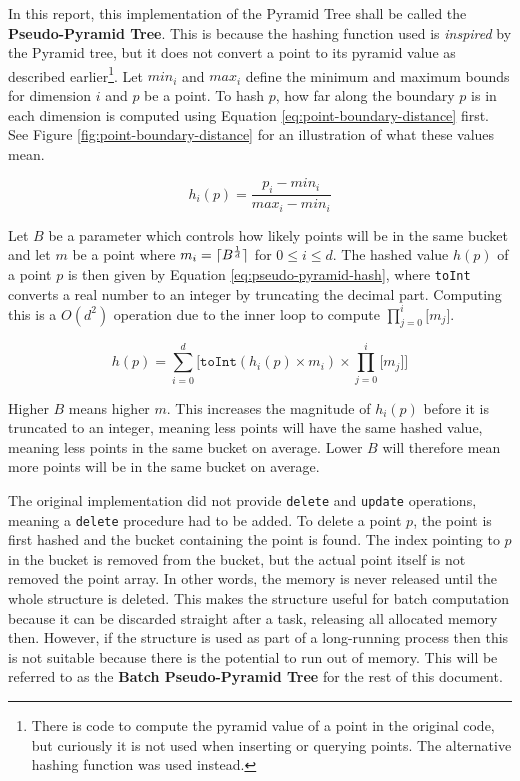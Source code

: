 In this report, this implementation of the Pyramid Tree shall be called the \textbf{Pseudo-Pyramid Tree}. This is because the hashing function used is \textit{inspired} by the Pyramid tree, but it does not convert a point to its pyramid value as described earlier\footnote{There is code to compute the pyramid value of a point in the original code, but curiously it is not used when inserting or querying points. The alternative hashing function was used instead.}. Let $min_i$ and $max_i$ define the minimum and maximum bounds for dimension $i$ and $p$ be a point. To hash $p$, how far along the boundary $p$ is in each dimension is computed using Equation \ref{eq:point-boundary-distance} first. See Figure \ref{fig:point-boundary-distance} for an illustration of what these values mean.


\begin{equation}
	h_i(p) = \frac{p_i - min_i}{max_i - min_i}
	\label{eq:point-boundary-distance}
\end{equation}

Let $B$ be a parameter which controls how likely points will be in the same bucket and let $m$ be a point where $m_i = \lceil B^{\frac{1}{d}}\rceil$ for $0 \leq i \leq d$. The hashed value $h(p)$ of a point $p$ is then given by Equation \ref{eq:pseudo-pyramid-hash},  where \texttt{toInt} converts a real number to an integer by truncating the decimal part. Computing this is a $O(d^2)$ operation due to the inner loop to compute $\prod_{j=0}^{i}{\lbrack m_j \rbrack}$.

\begin{equation}
	h(p) = \sum_{i = 0}^{d} { \lbrack \texttt{toInt}( h_i(p) \times m_i ) \times \prod_{j=0}^{i}{\lbrack m_j \rbrack} \rbrack }
	\label{eq:pseudo-pyramid-hash}
\end{equation}

Higher $B$ means higher $m$. This increases the magnitude of $h_i(p)$ before it is truncated to an integer, meaning less points will have the same hashed value, meaning less points in the same bucket on average. Lower $B$ will therefore mean more points will be in the same bucket on average.

The original implementation did not provide \texttt{delete} and \texttt{update} operations, meaning a \texttt{delete} procedure had to be added. To delete a point $p$, the point is first hashed and the bucket containing the point is found. The index pointing to $p$ in the bucket is removed from the bucket, but the actual point itself is not removed the point array. In other words, the memory is never released until the whole structure is deleted. This makes the structure useful for batch computation because it can be discarded straight after a task, releasing all allocated memory then. However, if the structure is used as part of a long-running process then this is not suitable because there is the potential to run out of memory. This will be referred to as the \textbf{Batch Pseudo-Pyramid Tree} for the rest of this document.

